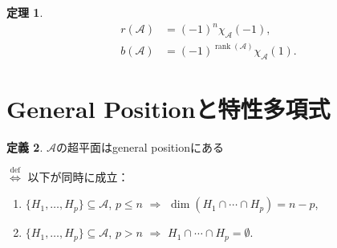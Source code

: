 \documentclass[xelatex,ja=standard,a4paper,14pt,everyparhook=compat]{bxjsarticle}
\newcommand{\mcA}{\mathcal{A}}
\DeclareMathOperator{\rank}{rank}
\theoremstyle{definition}
\newtheorem{theorem}{定理}
\newtheorem{definition}[theorem]{定義}
\begin{document}
\begin{theorem}
    \begin{align*}
        r(\mcA) & = (-1)^n \chi_\mcA(-1),            \\
        b(\mcA) & = (-1)^{\rank(\mcA)} \chi_\mcA(1).
    \end{align*}
\end{theorem}

\section{General Positionと特性多項式}

\begin{definition}
    $\mcA$の超平面はgeneral positionにある

    $\overset{\mathrm{def}}{\Longleftrightarrow}$ 以下が同時に成立： \begin{enumerate}
        \item $\{H_1,\ldots,H_p\} \subseteq \mcA$, $p \leq n$ $\Longrightarrow$ $\dim(H_1 \cap \cdots \cap H_p) = n-p$,
        \item $\{H_1,\ldots,H_p\} \subseteq \mcA$, $p > n$ $\Longrightarrow$ $H_1 \cap \cdots \cap H_p = \emptyset$.
    \end{enumerate}
\end{definition}
\end{document}
